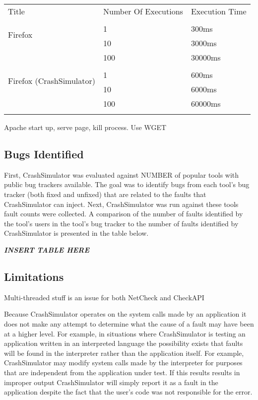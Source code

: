                 \begin{tabular}{l l l}
                    \toprule{}
                    Title & Number Of Executions & Execution Time \\
                    \multirow{3}{*}{Firefox} \\
                    & 1 & 300ms \\
                    & 10 & 3000ms \\
                    & 100 & 30000ms \\
                    \multirow{3}{*}{Firefox (CrashSimulator)} \\
                    & 1 & 600ms \\
                    & 10 & 6000ms \\
                    & 100 & 60000ms \\
                    \bottomrule{}
                \end{tabular}



        Apache start up, serve page, kill process. Use WGET

    \subsection{Bugs Identified}

    First, CrashSimulator was evaluated against NUMBER of popular tools with public bug trackers available. The goal was
    to identify bugs from each tool's bug tracker (both fixed and unfixed) that are related to the faults that
    CrashSimulator can inject. Next, CrashSimulator was run against these tools fault counts were collected. A
    comparison of the number of faults identified by the tool's users in the tool's bug tracker to the number of faults
    identified by CrashSimulator is presented in the table below.

    \emph{\textbf{INSERT TABLE HERE}}

    \subsection{Limitations}

        Multi-threaded stuff is an issue for both NetCheck and CheckAPI

        Because CrashSimulator operates on the system calls made by an application it does not make any attempt to
        determine what the cause of a fault may have been at a higher level. For example, in situations where
        CrashSimulator is testing an application written in an interpreted language the possibility exists that faults
        will be found in the interpreter rather than the application itself. For example, CrashSimulator may modify
        system calls made by the interpreter for purposes that are independent from the application under test.  If this
        results results in improper output CrashSimulator will simply report it as a fault in the application despite
        the fact that the user's code was not responsible for the error.
